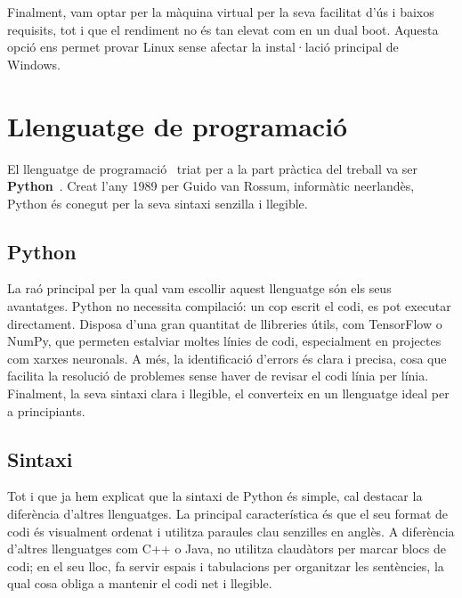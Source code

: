 Finalment, vam optar per la màquina virtual per la seva facilitat d’ús i baixos requisits, tot i que el rendiment no és tan elevat com en un dual boot. Aquesta opció ens permet provar Linux sense afectar la instal·lació principal de Windows.


\section{Llenguatge de programació}\label{sec:4.4}
El llenguatge de programació~\cite{LlenguatgeDeProgramacio} triat per a la part pràctica del treball va ser \textbf{Python}~\cite{Python}. Creat l'any 1989 per Guido van Rossum, informàtic neerlandès, Python és conegut per la seva sintaxi senzilla i llegible.

\subsection{Python}
La raó principal per la qual vam escollir aquest llenguatge són els seus avantatges. Python no necessita compilació: un cop escrit el codi, es pot executar directament. Disposa d’una gran quantitat de llibreries útils, com TensorFlow o NumPy, que permeten estalviar moltes línies de codi, especialment en projectes com xarxes neuronals. A més, la identificació d’errors és clara i precisa, cosa que facilita la resolució de problemes sense haver de revisar el codi línia per línia. Finalment, la seva sintaxi clara i llegible, el converteix en un llenguatge ideal per a principiants.
\subsection{Sintaxi}
Tot i que ja hem explicat que la sintaxi de Python és simple, cal destacar la diferència d’altres llenguatges. La principal característica és que el seu format de codi és visualment ordenat i utilitza paraules clau senzilles en anglès. A diferència d’altres llenguatges com C++ o Java, no utilitza claudàtors per marcar blocs de codi; en el seu lloc, fa servir espais i tabulacions per organitzar les sentències, la qual cosa obliga a mantenir el codi net i llegible.

